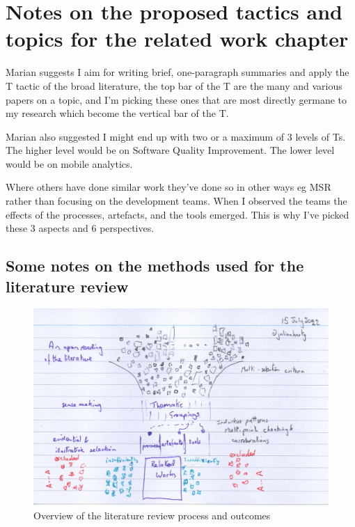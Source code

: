 \section{Notes on the proposed tactics and topics for the related work chapter}
Marian suggests I aim for writing brief, one-paragraph summaries and apply the T tactic of the broad literature, the top bar of the T are the many and various papers on a topic, and I'm picking these ones that are most directly germane to my research which become the vertical bar of the T. 

Marian also suggested I might end up with two or a maximum of 3 levels of Ts. The higher level would be on Software Quality Improvement. The lower level would be on mobile analytics.

Where others have done similar work they've done so in other ways eg MSR rather than focusing on the development teams. When I observed the teams the effects of the processes, artefacts, and the tools emerged. This is why I've picked these 3 aspects and 6 perspectives. 

\subsection*{Some notes on the methods used for the literature review}

\begin{figure}
    \centering
    \includegraphics[width=\textwidth]{images/rough-sketches/literature-review-overview.jpeg}
    \caption{Overview of the literature review process and outcomes}
    \label{fig:literature-review-overview}
\end{figure}

